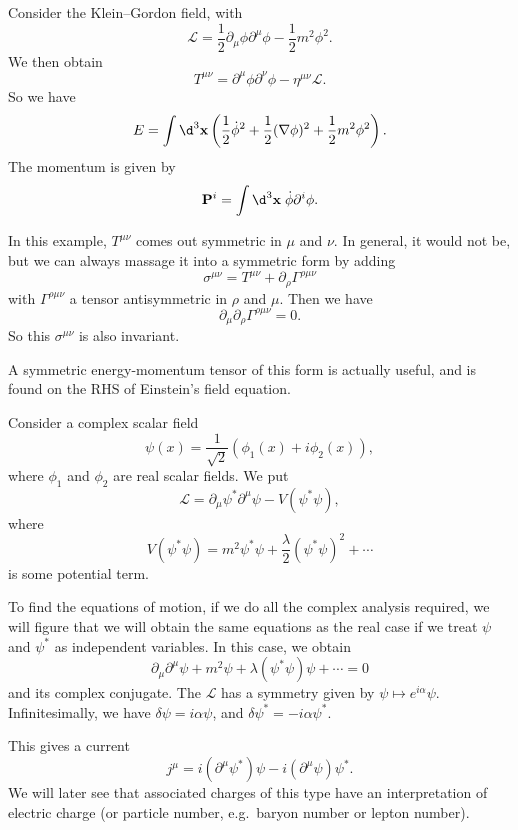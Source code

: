 \documentclass[a4paper]{article}
\begin{document}
\begin{eg}
  Consider the Klein--Gordon field, with
  \[
    \mathcal{L} = \frac{1}{2} \partial_\mu \phi \partial^\mu \phi - \frac{1}{2}m^2 \phi^2.
  \]
  We then obtain
  \[
    T^{\mu\nu} = \partial^\mu \phi \partial^\nu \phi - \eta^{\mu\nu} \mathcal{L}.
  \]
  So we have
  \[
    E = \int \d^3 \mathbf{x} \left(\frac{1}{2}\dot{\phi}^2 + \frac{1}{2}(\nabla \phi)^2 + \frac{1}{2}m^2 \phi^2\right).
  \]
  The momentum is given by
  \[
    \mathbf{P}^i = \int\d^3 \mathbf{x}\; \dot{\phi} \partial^i \phi.
  \]
\end{eg}
In this example, $T^{\mu\nu}$ comes out symmetric in $\mu$ and $\nu$. In general, it would not be, but we can always massage it into a symmetric form by adding
\[
  \sigma^{\mu\nu} = T^{\mu\nu} + \partial_\rho \Gamma^{\rho\mu\nu}
\]
with $\Gamma^{\rho\mu\nu}$ a tensor antisymmetric in $\rho$ and $\mu$. Then we have
\[
  \partial_\mu \partial_\rho \Gamma^{\rho\mu\nu} = 0.
\]
So this $\sigma^{\mu\nu}$ is also invariant.

A symmetric energy-momentum tensor of this form is actually useful, and is found on the RHS of Einstein's field equation.

\begin{eg}
  Consider a complex scalar field
  \[
    \psi(x) = \frac{1}{\sqrt{2}} (\phi_1(x) + i \phi_2(x)),
  \]
  where $\phi_1$ and $\phi_2$ are real scalar fields. We put
  \[
    \mathcal{L} = \partial_\mu \psi^* \partial^\mu \psi - V(\psi^*\psi),
  \]
  where
  \[
    V (\psi^*\psi) = m^2 \psi^* \psi + \frac{\lambda}{2}(\psi^*\psi)^2 + \cdots
  \]
  is some potential term.

  To find the equations of motion, if we do all the complex analysis required, we will figure that we will obtain the same equations as the real case if we treat $\psi$ and $\psi^*$ as independent variables. In this case, we obtain
  \[
    \partial_\mu \partial^\mu \psi + m^2 \psi + \lambda (\psi^*\psi) \psi + \cdots = 0
  \]
  and its complex conjugate.
  The $\mathcal{L}$ has a symmetry given by $\psi \mapsto e^{i\alpha} \psi$. Infinitesimally, we have $\delta \psi = i\alpha \psi$, and $\delta \psi^* = -i\alpha \psi^*$.

  This gives a current
  \[
    j^\mu = i(\partial^\mu \psi^*) \psi - i (\partial^\mu \psi)\psi^*.
  \]
  We will later see that associated charges of this type have an interpretation of electric charge (or particle number, e.g.\ baryon number or lepton number).
\end{eg}
\end{document}
